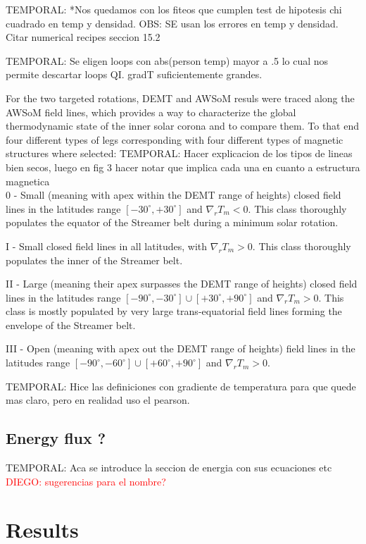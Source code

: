 \documentclass[namedreferences]{solarphysics}
\newcommand{\mdeg}{^\circ}
\def\diego#1{\textcolor{red}{DIEGO: #1}}
\def\temp#1{\textcolor{mygray}{TEMPORAL: #1}}
\begin{document}
\begin{article}
\temp{*Nos quedamos con los fiteos que cumplen test de hipotesis chi cuadrado en temp y densidad.
OBS: SE usan los errores en temp y densidad. Citar numerical recipes seccion 15.2 \citet{recipes}}

\temp{Se eligen loops con abs(person temp) mayor a .5 lo cual nos permite descartar loops QI. gradT suficientemente grandes.}

For the two targeted rotations, DEMT and AWSoM resuls were traced along the AWSoM field lines, which provides a way to characterize the global thermodynamic state of the inner solar corona and to compare them. To that end four different types of legs corresponding with four different types of magnetic structures where selected:
\temp{Hacer explicacion de los tipos de lineas bien secos, luego en fig 3 hacer notar que implica cada una en cuanto a estructura magnetica}\\
  0 - Small (meaning with apex within the DEMT range of heights) closed field lines in the latitudes range $[-30\mdeg,+30\mdeg]$ and $\nabla_r T_m < 0$. This class thoroughly populates the equator of the Streamer belt during a minimum solar rotation.

  I - Small closed field lines in all latitudes, with $\nabla_r T_m > 0$. This class thoroughly populates the inner of the Streamer belt.

  II - Large (meaning their apex surpasses the DEMT range of heights) closed field lines in the latitudes range $[-90\mdeg,-30\mdeg] \cup [+30\mdeg,+90\mdeg]$ and $\nabla_r T_m > 0$. This class is mostly populated by very large trans-equatorial field lines forming the envelope of the Streamer belt. 

 III - Open (meaning with apex out the DEMT range of heights) field lines in the latitudes range $[-90\mdeg,-60\mdeg] \cup [+60\mdeg,+90\mdeg]$ and $\nabla_r T_m > 0$.

\temp{Hice las definiciones con gradiente de temperatura para que quede mas claro, pero en realidad uso el pearson.} 




\subsection{Energy flux ?}\label{energia} 
\temp{Aca se introduce la seccion de energia con sus ecuaciones etc}
\diego{sugerencias para el nombre?}
\section{Results}\label{resu} 




\end{article}
\end{document}
